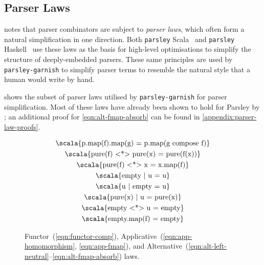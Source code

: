 \documentclass[../../../main.tex]{subfiles}
\begin{document}
\subsection{Parser Laws}
\textcite{willis_parsley_2024} notes that parser combinators are subject to \emph{parser laws}, which often form a natural simplification in one direction.
Both \texttt{parsley} Scala~\cite{willis_garnishing_2018} and \texttt{parsley} Haskell~\cite{willis_staged_2023,willis_parsley_2024} use these laws as the basis for high-level optimisations to simplify the structure of deeply-embedded parsers.
These same principles are used by \texttt{parsley-garnish} to simplify parser terms to resemble the natural style that a human would write by hand.

 shows the subset of parser laws utilised by \texttt{parsley-garnish} for parser simplification.
Most of these laws have already been shown to hold for Parsley by \textcite{willis_garnishing_2018}; an additional proof for \cref{eqn:alt-fmap-absorb} can be found in \cref{appendix:parser-law-proofs}.

\begin{figure}[htbp]
\centering
\begin{gather}
  \text{\scala{p.map(f).map(g) = p.map(g compose f)}} \label{eqn:functor-comp} \\
  \text{\scala{pure(f) <*> pure(x) = pure(f(x))}} \label{eqn:app-homomorphism} \\
  \text{\scala{pure(f) <*> x = x.map(f)}} \label{eqn:app-fmap} \\
  \text{\scala{empty | u = u}} \label{eqn:alt-left-neutral} \\
  \text{\scala{u | empty = u}} \label{eqn:alt-right-neutral} \\
  \text{\scala{pure(x) | u = pure(x)}} \label{eqn:alt-left-biased-choice} \\
  \text{\scala{empty <*> u = empty}} \label{eqn:alt-empty-absorb} \\
  \text{\scala{empty.map(f) = empty}} \label{eqn:alt-fmap-absorb}
\end{gather}
\caption{Functor~(\ref{eqn:functor-comp}), Applicative~(\ref{eqn:app-homomorphism}, \ref{eqn:app-fmap}), and Alternative~(\ref{eqn:alt-left-neutral}--\ref{eqn:alt-fmap-absorb}) laws.}
\label{fig:parser-laws}
\end{figure}
\end{document}
